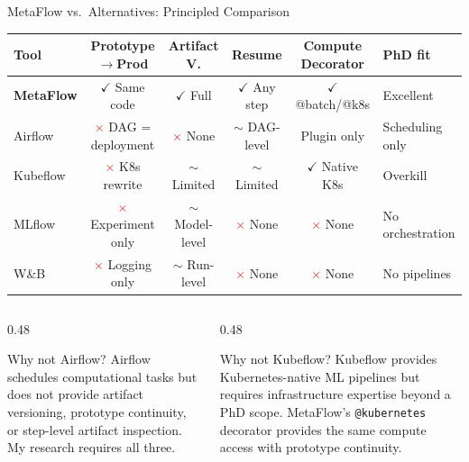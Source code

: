 \documentclass[10pt,aspectratio=169]{beamer}
\begin{document}
\begin{frame}{MetaFlow vs.\ Alternatives: Principled Comparison}

\begin{center}\small
\begin{tabular}{@{}lccccl@{}}
\toprule
\textbf{Tool} & \textbf{Prototype$\to$Prod} & \textbf{Artifact V.} & \textbf{Resume} & \textbf{Compute Decorator} & \textbf{PhD fit} \\
\midrule
\textbf{MetaFlow}   & \textcolor{mfgreen}{$\checkmark$} Same code & \textcolor{mfgreen}{$\checkmark$} Full & \textcolor{mfgreen}{$\checkmark$} Any step & \textcolor{mfgreen}{$\checkmark$} @batch/@k8s & Excellent \\
Airflow    & \textcolor{red}{$\times$} DAG = deployment & \textcolor{red}{$\times$} None & \textcolor{mforange}{$\sim$} DAG-level & Plugin only & Scheduling only \\
Kubeflow   & \textcolor{red}{$\times$} K8s rewrite & \textcolor{mforange}{$\sim$} Limited & \textcolor{mforange}{$\sim$} Limited & \textcolor{mfgreen}{$\checkmark$} Native K8s & Overkill \\
MLflow     & \textcolor{red}{$\times$} Experiment only & \textcolor{mforange}{$\sim$} Model-level & \textcolor{red}{$\times$} None & \textcolor{red}{$\times$} None & No orchestration \\
W\&B       & \textcolor{red}{$\times$} Logging only & \textcolor{mforange}{$\sim$} Run-level & \textcolor{red}{$\times$} None & \textcolor{red}{$\times$} None & No pipelines \\
\bottomrule
\end{tabular}
\end{center}

\vspace{0.2cm}
\begin{columns}
\begin{column}{0.48\textwidth}
\begin{block}{Why not Airflow?}
\small Airflow schedules computational tasks but does not provide artifact versioning, prototype continuity, or step-level artifact inspection. My research requires all three.
\end{block}
\end{column}
\begin{column}{0.48\textwidth}
\begin{block}{Why not Kubeflow?}
\small Kubeflow provides Kubernetes-native ML pipelines but requires infrastructure expertise beyond a PhD scope. MetaFlow's \texttt{@kubernetes} decorator provides the same compute access with prototype continuity.
\end{block}
\end{column}
\end{columns}

\end{frame}
\end{document}
